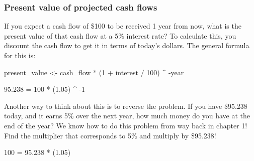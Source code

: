 \documentclass[]{article}
\newenvironment{Shaded}{\begin{snugshade}}{\end{snugshade}}
\newcommand{\DecValTok}[1]{\textcolor[rgb]{0.00,0.00,0.81}{#1}}
\newcommand{\FloatTok}[1]{\textcolor[rgb]{0.00,0.00,0.81}{#1}}
\newcommand{\StringTok}[1]{\textcolor[rgb]{0.31,0.60,0.02}{#1}}
\newcommand{\CommentTok}[1]{\textcolor[rgb]{0.56,0.35,0.01}{\textit{#1}}}
\newcommand{\OperatorTok}[1]{\textcolor[rgb]{0.81,0.36,0.00}{\textbf{#1}}}
\newcommand{\NormalTok}[1]{#1}
\begin{document}
\begin{Shaded}
\end{Shaded}

\subsubsection{Present value of projected cash
flows}\label{present-value-of-projected-cash-flows}

If you expect a cash flow of \$100 to be received 1 year from now, what
is the present value of that cash flow at a 5\% interest rate? To
calculate this, you discount the cash flow to get it in terms of today's
dollars. The general formula for this is:

present\_value \textless{}- cash\_flow * (1 + interest / 100) \^{} -year

95.238 = 100 * (1.05) \^{} -1

Another way to think about this is to reverse the problem. If you have
\$95.238 today, and it earns 5\% over the next year, how much money do
you have at the end of the year? We know how to do this problem from way
back in chapter 1! Find the multiplier that corresponds to 5\% and
multiply by \$95.238!

100 = 95.238 * (1.05)

\begin{Shaded}
\end{Shaded}
\end{document}
